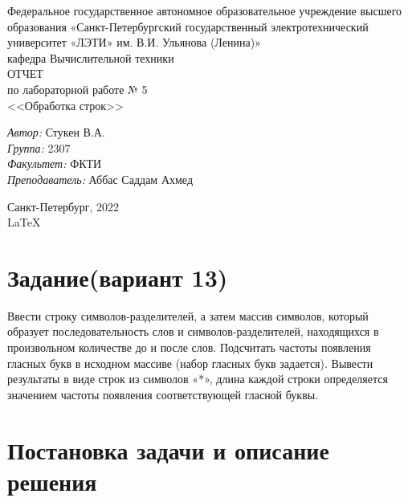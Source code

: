 \documentclass[a4paper,12pt]{report}
\begin{document}
 

\begin{titlepage} 

\begin{center} 

\large Федеральное государственное автономное образовательное учреждение высшего образования «Санкт-Петербургский государственный электротехнический университет «ЛЭТИ» им. В.И. Ульянова (Ленина)»\\
кафедра Вычислительной техники\\[5cm] 

\huge ОТЧЕТ\\ по лабораторной работе № 5\\[0.5cm] 
\large <<Обработка строк>>\\[3.7cm]

\begin{minipage}{1\textwidth}
    \begin{flushleft}
        \emph{Автор:} Стукен В.А.\\
        \emph{Группа:} 2307\\
        \emph{Факультет:} ФКТИ\\
        \emph{Преподаватель:} Аббас Саддам Ахмед\\
    \end{flushleft}
\end{minipage}

\vfill

Санкт-Петербург, 2022\\
{\large \LaTeX}

\end{center}
\thispagestyle{empty}
\end{titlepage}

\section*{Задание(вариант 13)}
Ввести строку символов-разделителей, а затем массив символов, который образует последовательность слов и символов-разделителей, 
находящихся в произвольном количестве до и после слов. 
Подсчитать частоты появления гласных букв в исходном массиве (набор гласных букв задается). 
Вывести результаты в виде строк из символов «*», длина каждой строки определяется значением частоты появления соответствующей гласной буквы.
\section*{Постановка задачи и описание решения}
\par
\end{document}
